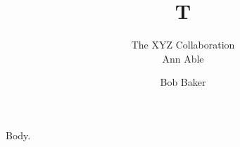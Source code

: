 \documentclass[epj]{svjour}
\begin{document}
\title{T}
\author{{The XYZ Collaboration}\\[2ex]Ann Able \and Bob Baker}
\maketitle
Body.
\end{document}
